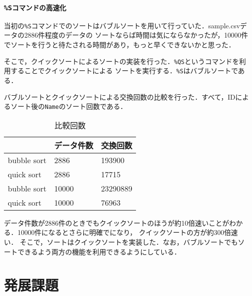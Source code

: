 \documentclass[a4j,11pt]{jarticle}
\begin{document}
\subsubsection{\texttt{\%Sコマンドの高速化}}
当初の\verb|%S|コマンドでのソートはバブルソートを用いて行っていた．sample.csvデータの2886件程度のデータの
ソートならば時間は気にならなかったが，10000件でソートを行うと待たされる時間があり，もっと早くできないかと思った．

そこで，クイックソートによるソートの実装を行った．\verb|%QS|というコマンドを利用することでクイックソートによる
ソートを実行する．\verb|%S|はバブルソートである．

バブルソートとクイックソートによる交換回数の比較を行った．すべて，IDによるソート後の\verb|Name|のソート回数である．
\begin{table}[t]
    \centering %
    \caption{比較回数}
\begin{tabular}{|l|l|l|}
\hline
            & データ件数 & 交換回数     \\ \hline
bubble sort & 2886  & 193900   \\ \hline
quick sort  & 2886  & 17715    \\ \hline
bubble sort & 10000 & 23290889 \\ \hline
quick sort  & 10000 & 76963    \\ \hline
\end{tabular}
\end{table}

データ件数が2886件のときでもクイックソートのほうが約10倍速いことがわかる．10000件になるとさらに明確でになり，
クイックソートの方が約300倍速い．
そこで，ソートはクイックソートを実装した．なお，バブルソートでもソートできるよう両方の機能を利用できるようにしている．
\section{発展課題}\label{sec:hatten}
\end{document}
